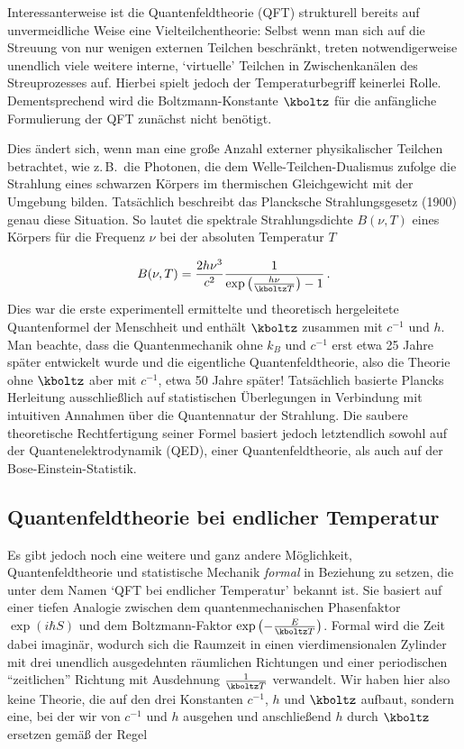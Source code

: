 \documentclass{scrartcl}
\begin{document}
\newpage {}
\label{sec:0111}

Interessanterweise ist die Quantenfeldtheorie (QFT) strukturell bereits auf unvermeidliche Weise eine Vielteilchentheorie: Selbst wenn man sich auf die Streuung von nur wenigen externen Teilchen beschränkt, treten notwendigerweise unendlich viele weitere interne, \enquote*{virtuelle} Teilchen in Zwischenkanälen des Streuprozesses auf. Hierbei spielt jedoch der Temperaturbegriff keinerlei Rolle. Dementsprechend wird die Boltzmann-Konstante $\kboltz$ für die anfängliche Formulierung der QFT zunächst nicht benötigt.

Dies ändert sich, wenn man eine große Anzahl externer physikalischer Teilchen betrachtet, wie z.\,B.\ die Photonen, die dem Welle-Teilchen-Dualismus zufolge die Strahlung eines schwarzen Körpers im thermischen Gleichgewicht mit der Umgebung bilden. Tatsächlich beschreibt das Plancksche Strahlungsgesetz (1900) genau diese Situation. So lautet die spektrale Strahlungsdichte $B(\nu,T)$ eines Körpers für die Frequenz $\nu$ bei der absoluten Temperatur $T$

\begin{equation*}
  B(\nu,T)=\frac{2 h \nu^3}{c^2} \frac{1}{\exp\left(\frac{h \nu}{\kboltz T}\right)-1}\,.
\end{equation*}
%
Dies war die erste experimentell ermittelte und theoretisch hergeleitete Quantenformel der Menschheit und enthält $\kboltz$ zusammen mit $c^{-1}$ und $h$. Man beachte, dass die Quantenmechanik ohne $k_B$ und $c^{-1}$ erst etwa 25 Jahre später entwickelt wurde und die eigentliche Quantenfeldtheorie, also die Theorie ohne $\kboltz$ aber mit $c^{-1}$, etwa 50 Jahre später! Tatsächlich basierte Plancks Herleitung ausschließlich auf statistischen Überlegungen in Verbindung mit intuitiven Annahmen über die Quantennatur der Strahlung. Die saubere theoretische Rechtfertigung seiner Formel basiert jedoch letztendlich sowohl auf der Quantenelektrodynamik (QED), einer Quantenfeldtheorie, als auch auf der Bose-Einstein-Statistik.


\subsection*{Quantenfeldtheorie bei endlicher Temperatur}

Es gibt jedoch noch eine weitere und ganz andere Möglichkeit, Quantenfeldtheorie und statistische Mechanik \emph{formal} in Beziehung zu setzen, die unter dem Namen \enquote*{QFT bei endlicher Temperatur} bekannt ist. Sie basiert auf einer tiefen Analogie zwischen dem quantenmechanischen Phasenfaktor $\exp\left(i \hbar S\right)$ und dem Boltzmann-Faktor $\exp\left(-\frac{E}{\kboltz T}\right)$. Formal wird die Zeit dabei imaginär, wodurch sich die Raumzeit in einen vierdimensionalen Zylinder mit drei unendlich ausgedehnten räumlichen Richtungen und einer periodischen \enquote{zeitlichen} Richtung mit Ausdehnung
$\frac{1}{\kboltz T}$ verwandelt. Wir haben hier also keine Theorie, die auf den drei Konstanten $c^{-1}$, $h$ und $\kboltz$ aufbaut, sondern eine, bei der wir von $c^{-1}$ und $h$ ausgehen und anschließend $h$ durch $\kboltz$ ersetzen gemäß der Regel 
\end{document}
